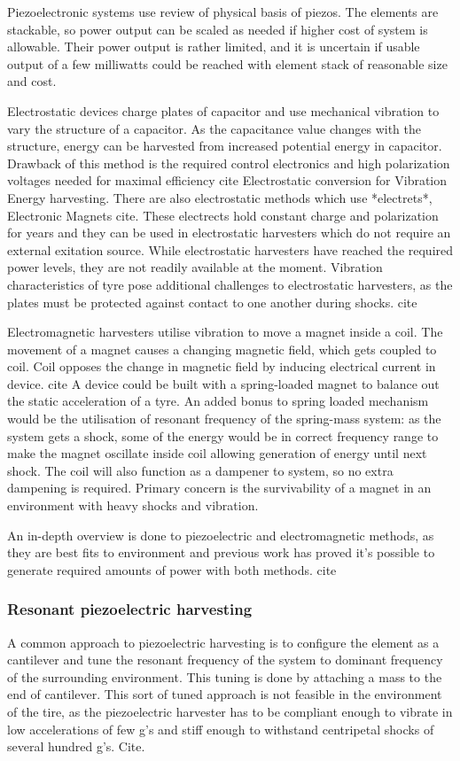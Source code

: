 Piezoelectronic systems use {\color{red} review of physical basis of piezos}.  The elements are stackable, so power output can be scaled as needed if higher cost of system is allowable. Their power output is rather limited, and it is uncertain if usable output of a few milliwatts could be reached with element stack of reasonable size and cost.

Electrostatic devices charge plates of capacitor and use mechanical vibration to vary the structure of a capacitor. As the capacitance value changes with the structure, energy can be harvested from increased potential energy in capacitor. Drawback of this method is the required control electronics and high polarization voltages needed for maximal efficiency {\color{red} cite Electrostatic conversion for Vibration Energy harvesting}. There are also electrostatic methods which use *electrets*, Electronic Magnets {\color{red} cite}. These electrects hold constant charge and polarization for years and they can be used in electrostatic harvesters which do not require an external exitation source. While electrostatic harvesters have reached the required power levels, they are not readily available at the moment. Vibration characteristics of tyre pose additional challenges to electrostatic harvesters, as the plates must be protected against contact to one another during shocks. {\color{red} cite}

Electromagnetic harvesters utilise vibration to move a magnet inside a coil. The movement of a magnet causes a changing magnetic field, which gets coupled to coil. Coil opposes the change in magnetic field by inducing electrical current in device. {\color{red} cite} A device could be built with a spring-loaded magnet to balance out the static acceleration of a tyre. An added bonus to spring loaded mechanism would be the utilisation of resonant frequency of the spring-mass system: as the system gets a shock, some of the energy would be in correct frequency range to make the magnet oscillate inside coil allowing generation of energy until next shock. The coil will also function  as a dampener to system, so no extra dampening is required. Primary concern is the survivability of a magnet in an environment with heavy shocks and vibration. 

An in-depth overview is done to piezoelectric and electromagnetic methods, as they are best fits to environment and previous work has proved it's possible to generate required amounts of power with both methods.{\color{red} cite}

\subsubsection{Resonant piezoelectric harvesting}
A common approach to piezoelectric harvesting is to configure the element as a cantilever and tune the resonant frequency of the system to dominant frequency of the surrounding environment. This tuning is done by attaching a mass to the end of cantilever. This sort of tuned approach is not feasible in the environment of the tire, as the piezoelectric harvester has to be compliant enough to vibrate in low accelerations of few g's and stiff enough to withstand centripetal shocks of several hundred g's. {\color{red} Cite}. 

